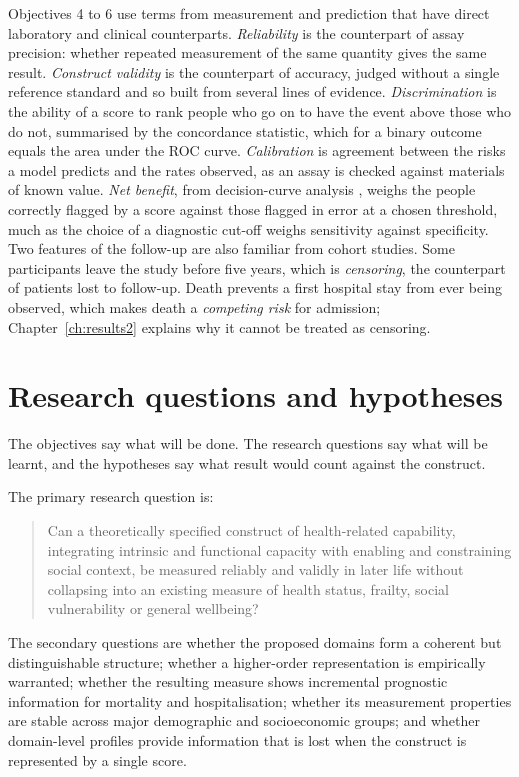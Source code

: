 Objectives 4 to 6 use terms from measurement and prediction that have direct laboratory and clinical counterparts. \emph{Reliability} is the counterpart of assay precision: whether repeated measurement of the same quantity gives the same result. \emph{Construct validity} is the counterpart of accuracy, judged without a single reference standard and so built from several lines of evidence. \emph{Discrimination} is the ability of a score to rank people who go on to have the event above those who do not, summarised by the concordance statistic, which for a binary outcome equals the area under the ROC curve. \emph{Calibration} is agreement between the risks a model predicts and the rates observed, as an assay is checked against materials of known value. \emph{Net benefit}, from decision-curve analysis \citep{vickers_elkin_2006}, weighs the people correctly flagged by a score against those flagged in error at a chosen threshold, much as the choice of a diagnostic cut-off weighs sensitivity against specificity. Two features of the follow-up are also familiar from cohort studies. Some participants leave the study before five years, which is \emph{censoring}, the counterpart of patients lost to follow-up. Death prevents a first hospital stay from ever being observed, which makes death a \emph{competing risk} for admission; Chapter~\ref{ch:results2} explains why it cannot be treated as censoring.

\section{Research questions and hypotheses}

The objectives say what will be done. The research questions say what will be learnt, and the hypotheses say what result would count against the construct.

The primary research question is:
\begin{quote}
Can a theoretically specified construct of health-related capability, integrating intrinsic and functional capacity with enabling and constraining social context, be measured reliably and validly in later life without collapsing into an existing measure of health status, frailty, social vulnerability or general wellbeing?
\end{quote}

The secondary questions are whether the proposed domains form a coherent but distinguishable structure; whether a higher-order representation is empirically warranted; whether the resulting measure shows incremental prognostic information for mortality and hospitalisation; whether its measurement properties are stable across major demographic and socioeconomic groups; and whether domain-level profiles provide information that is lost when the construct is represented by a single score.

